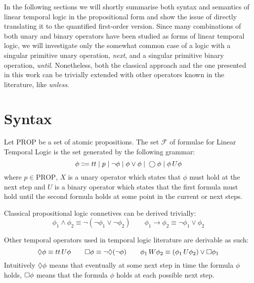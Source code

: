 In the following sections we will shortly summarise both syntax and semantics of linear temporal logic in the
propositional form and show the issue of directly translating it to the quantified first-order version.
Since many combinations of both unary and binary operators have been studied as forms of linear temporal logic, we will
investigate only the somewhat common case of a logic with a singular primitive unary operation, \emph{next}, and a
singular primitive binary operation, \emph{until}. Nonetheless, both the classical approach and the one presented in
this work can be trivially extended with other operators known in the literature, like \emph{unless}.

\section{Syntax}

\begin{definition}
  Let $\text{PROP}$ be a set of atomic propositions. The set $\mathcal{F}$ of formulae for Linear Temporal Logic is the
  set generated by the following grammar:
  \[
    \phi \Coloneqq tt \;|\; p
                      \;|\; \neg\phi
                      \;|\; \phi \lor \phi
                      \;|\; \bigcirc{\phi}
                      \;|\; {\phi}\,U {\phi}
  \]
  where $p \in \text{PROP}$, $X$ is a unary operator which states that $\phi$ must hold at the next step and $U$ is a
  binary operator which states that the first formula must hold until the second formula holds at some point in the
  current or next steps.
\end{definition}

Classical propositional logic connetives can be derived trivially:
\[
  \phi_1 \land \phi_2 \equiv \neg(\neg\phi_1 \lor \neg\phi_2) \qquad
  \phi_1 \to \phi_2 \equiv \neg\phi_1 \lor \phi_2
\]

Other temporal operators used in temporal logic literature are derivable as such:
\[
  \Diamond{\phi} \equiv {tt}\,U {\phi} \qquad
  \Box{\phi} \equiv \neg\Diamond{(}\neg\phi) \qquad
  {\phi_1}\,W {\phi_2} \equiv ({\phi_1}\,U {\phi_2}) \lor \Box{\phi_1}
\]
Intuitively $\Diamond{\phi}$ means that eventually at some next step in time the formula $\phi$ holds,
$\Box{\phi}$ means that the formula $\phi$ holds at each possible next step.

